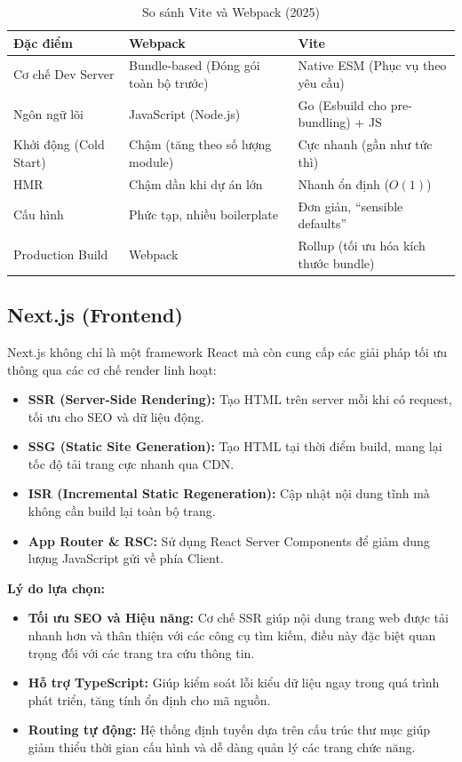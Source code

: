 \documentclass[12pt,a4paper]{report}
\begin{document}
\begin{table}[H]
\centering
\caption{So sánh Vite và Webpack (2025)}
\label{tab:vite_webpack}
\begin{tabularx}{\textwidth}{|l|X|X|}
\hline
\textbf{Đặc điểm} & \textbf{Webpack} & \textbf{Vite} \\ \hline
Cơ chế Dev Server & Bundle-based (Đóng gói toàn bộ trước) & Native ESM (Phục vụ theo yêu cầu) \\ \hline
Ngôn ngữ lõi & JavaScript (Node.js) & Go (Esbuild cho pre-bundling) + JS \\ \hline
Khởi động (Cold Start) & Chậm (tăng theo số lượng module) & Cực nhanh (gần như tức thì) \\ \hline
HMR & Chậm dần khi dự án lớn & Nhanh ổn định ($O(1)$) \\ \hline
Cấu hình & Phức tạp, nhiều boilerplate & Đơn giản, ``sensible defaults'' \\ \hline
Production Build & Webpack & Rollup (tối ưu hóa kích thước bundle) \\ \hline
\end{tabularx}
\end{table}

\subsection{Next.js (Frontend)}
Next.js không chỉ là một framework React mà còn cung cấp các giải pháp tối ưu thông qua các cơ chế render linh hoạt:
\begin{itemize}
    \item \textbf{SSR (Server-Side Rendering):} Tạo HTML trên server mỗi khi có request, tối ưu cho SEO và dữ liệu động.
    \item \textbf{SSG (Static Site Generation):} Tạo HTML tại thời điểm build, mang lại tốc độ tải trang cực nhanh qua CDN.
    \item \textbf{ISR (Incremental Static Regeneration):} Cập nhật nội dung tĩnh mà không cần build lại toàn bộ trang.
    \item \textbf{App Router \& RSC:} Sử dụng React Server Components để giảm dung lượng JavaScript gửi về phía Client.
\end{itemize}

\textbf{Lý do lựa chọn:}
\begin{itemize}
    \item \textbf{Tối ưu SEO và Hiệu năng:} Cơ chế SSR giúp nội dung trang web được tải nhanh hơn và thân thiện với các công cụ tìm kiếm, điều này đặc biệt quan trọng đối với các trang tra cứu thông tin.
    \item \textbf{Hỗ trợ TypeScript:} Giúp kiểm soát lỗi kiểu dữ liệu ngay trong quá trình phát triển, tăng tính ổn định cho mã nguồn.
    \item \textbf{Routing tự động:} Hệ thống định tuyến dựa trên cấu trúc thư mục giúp giảm thiểu thời gian cấu hình và dễ dàng quản lý các trang chức năng.
\end{itemize}
\end{document}
